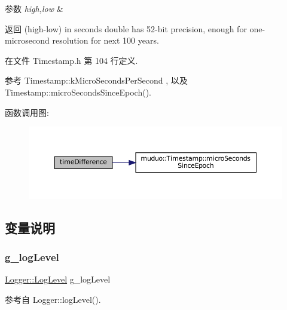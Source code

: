 \begin{DoxyParams}{参数}
{\em high,low} & \\
\hline
\end{DoxyParams}
\begin{DoxyReturn}{返回}
(high-\/low) in seconds {\ttfamily double} has 52-\/bit precision, enough for one-\/microsecond resolution for next 100 years. 
\end{DoxyReturn}


在文件 Timestamp.\+h 第 104 行定义.



参考 Timestamp\+::k\+Micro\+Seconds\+Per\+Second , 以及 Timestamp\+::micro\+Seconds\+Since\+Epoch().

函数调用图\+:
\nopagebreak
\begin{figure}[H]
\begin{center}
\leavevmode
\includegraphics[width=350pt]{namespacemuduo_a6f7c17d86f2474f297b3b9e54b500907_cgraph}
\end{center}
\end{figure}


\subsection{变量说明}
\mbox{\label{namespacemuduo_ac758fb9f0d1703994b7e23772d09f183}} 
\subsubsection{\texorpdfstring{g\+\_\+log\+Level}{g\_logLevel}}
{\footnotesize\ttfamily \hyperlink{classmuduo_1_1Logger_aca1fd1d8935433e6ba2e3918214e07f9}{Logger\+::\+Log\+Level} g\+\_\+log\+Level}



参考自 Logger\+::log\+Level().

